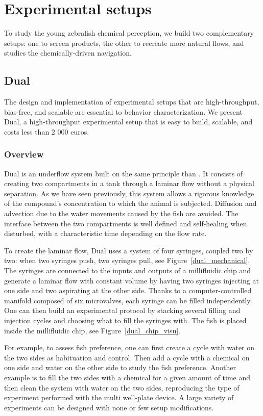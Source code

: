 \chapter{Experimental setups}
  To study the young zebrafish chemical perception, we build two complementary setups: one to screen products, the other to recreate more natural flows, and studies the chemically-driven navigation.

  \section{Dual}
  The design and implementation of experimental setups that are high-throughput, bias-free, and scalable are essential to behavior characterization. We present Dual, a high-throughput experimental setup that is easy to build, scalable, and costs less than 2 000 euros.

  \subsection{Overview}
  Dual is an underflow system built on the same principle than \cite{readman2013fish}. It consists of creating two compartments in a tank through a laminar flow without a physical separation. As we have seen previously, this system allows a rigorous knowledge of the compound's concentration to which the animal is subjected. Diffusion and advection due to the water movements caused by the fish are avoided. The interface between the two compartments is well defined and self-healing when disturbed, with a characteristic time depending on the flow rate.

  To create the laminar flow, Dual uses a system of four syringes, coupled two by two: when two syringes push, two syringes pull, see Figure~\ref{dual_mechanical}. The syringes are connected to the inputs and outputs of a millifluidic chip and generate a laminar flow with constant volume by having two syringes injecting at one side and two aspirating at the other side. Thanks to a computer-controlled manifold composed of six microvalves, each syringe can be filled independently. One can then build an experimental protocol by stacking several filling and injection cycles and choosing what to fill the syringes with. The fish is placed inside the millifluidic chip, see Figure~\ref{dual_chip_visu}.

  For example, to assess fish preference, one can first create a cycle with water on the two sides as habituation and control. Then add a cycle with a chemical on one side and water on the other side to study the fish preference. Another example is to fill the two sides with a chemical for a given amount of time and then clean the system with water on the two sides, reproducing the type of experiment performed with the multi well-plate device. A large variety of experiments can be designed with none or few setup modifications.

